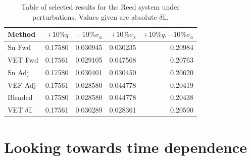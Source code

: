 \documentclass[12pt]{report}
\newcommand{\Edd}{\mathbb{E}}
\newcommand{\sigs}{\sigma_s}
\newcommand{\siga}{\sigma_a}
\begin{document}
\begin{table}[H]
\centering
  \begin{tabular}{| l | r | r | r | r |}
    \hline
    Method  &  $+10\% q $  & $-10\% \siga $ & $+10\% \sigs $ & $+10\% q,-10\% \siga$ \\ \hline
     Sn Fwd 			&0.17580 &0.030945 &0.030235 & 0.20984\\ \hline
     VET Fwd 			&0.17561 &0.029105 &0.047568 &0.20763\\ \hline
     Sn Adj 			&0.17580 &0.030401 &0.030450 &0.20620\\ \hline
     VEF Adj 			&0.17561 &0.028580 &0.044778 &0.20419\\ \hline
     Blended 			&0.17580 &0.028580 &0.044778 &0.20438\\ \hline
     VET $\delta \Edd$ 	&0.17561 &0.030289 &0.028361 &0.20590\\ \hline
    \end{tabular}
  \caption{Table of selected results for the Reed system under perturbations. Values given are absolute $\delta \Edd$. }
\end{table}

\section{Looking towards time dependence}


%


% 
%

\let\oldbibitem\bibitem
\renewcommand{\bibitem}{\setlength{\itemsep}{0pt}\oldbibitem}


{}

\renewcommand{\bibname}{{\normalsize\rm REFERENCES}}






%
\end{document}
